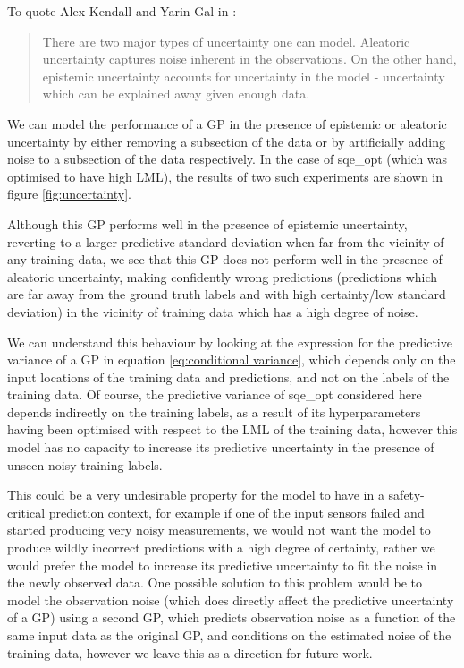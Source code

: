 To quote Alex Kendall and Yarin Gal in \cite{kendall2017uncertainties}:

\begin{quote}
    There are two major types of uncertainty one can model. Aleatoric uncertainty captures noise inherent in the observations. On the other hand, epistemic uncertainty accounts for uncertainty in the model - uncertainty which can be explained away given enough data.
\end{quote}

We can model the performance of a GP in the presence of epistemic or aleatoric uncertainty by either removing a subsection of the data or by artificially adding noise to a subsection of the data respectively. In the case of sqe\_opt (which was optimised to have high LML), the results of two such experiments are shown in figure \ref{fig:uncertainty}.

Although this GP performs well in the presence of epistemic uncertainty, reverting to a larger predictive standard deviation when far from the vicinity of any training data, we see that this GP does not perform well in the presence of aleatoric uncertainty, making confidently wrong predictions (predictions which are far away from the ground truth labels and with high certainty/low standard deviation) in the vicinity of training data which has a high degree of noise.

We can understand this behaviour by looking at the expression for the predictive variance of a GP in equation \ref{eq:conditional variance}, which depends only on the input locations of the training data and predictions, and not on the labels of the training data. Of course, the predictive variance of sqe\_opt considered here depends indirectly on the training labels, as a result of its hyperparameters having been optimised with respect to the LML of the training data, however this model has no capacity to increase its predictive uncertainty in the presence of unseen noisy training labels.

This could be a very undesirable property for the model to have in a safety-critical prediction context, for example if one of the input sensors failed and started producing very noisy measurements, we would not want the model to produce wildly incorrect predictions with a high degree of certainty, rather we would prefer the model to increase its predictive uncertainty to fit the noise in the newly observed data. One possible solution to this problem would be to model the observation noise (which does directly affect the predictive uncertainty of a GP) using a second GP, which predicts observation noise as a function of the same input data as the original GP, and conditions on the estimated noise of the training data, however we leave this as a direction for future work.

